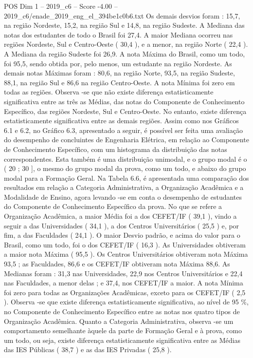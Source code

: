 \begin{textsample}{POS Dim 1 – 2019\_c6 – Score -4.00 – 2019\_c6/enade\_2019\_eng\_el\_394be1c0b6.txt}
Os demais desvios foram : 15,7, na região Nordeste, 15,2, na região Sul e 14,8, na região Sudeste.
A Mediana das notas dos estudantes de todo o Brasil foi 27,4.
A maior Mediana ocorreu nas regiões Nordeste, Sul e Centro-Oeste ( 30,4 ), e a menor, na região Norte ( 22,4 ).
A Mediana da região Sudeste foi 26,9.
A nota Máxima do Brasil, como um todo, foi 95,5, sendo obtida por, pelo menos, um estudante na região Nordeste.
As demais notas Máximas foram : 80,6, na região Norte, 93,5, na região Sudeste, 88,1, na região Sul e 86,6 na região Centro-Oeste.
A nota Mínima foi zero em todas as regiões.
Observa -se que não existe diferença estatisticamente significativa entre as três as Médias, das notas do Componente de Conhecimento Específico, das regiões Nordeste, Sul e Centro-Oeste.
No entanto, existe diferença estatisticamente significativa entre as demais regiões.
Assim como nos Gráficos 6.1 e 6.2, no Gráfico 6.3, apresentado a seguir, é possível ser feita uma avaliação do desempenho de concluintes de Engenharia Elétrica, em relação ao Componente de Conhecimento Específico, com um histograma da distribuição das notas correspondentes.
Esta também é uma distribuição unimodal, e o grupo modal é o ( 20 ; 30 ], o mesmo do grupo modal da prova, como um todo, e abaixo do grupo modal para a Formação Geral.
Na Tabela 6.6, é apresentada uma comparação dos resultados em relação a Categoria Administrativa, a Organização Acadêmica e a Modalidade de Ensino, agora levando -se em conta o desempenho de estudantes do Componente de Conhecimento Específico da prova.
No que se refere a Organização Acadêmica, a maior Média foi a dos CEFET/IF ( 39,1 ), vindo a seguir a das Universidades ( 34,1 ), a dos Centros Universitários ( 25,5 ) e, por fim, a das Faculdades ( 24,1 ).
O maior Desvio padrão, e acima do valor para o Brasil, como um todo, foi o dos CEFET/IF ( 16,3 ).
As Universidades obtiveram a maior nota Máxima ( 95,5 ).
Os Centros Universitários obtiveram nota Máxima 93,5 ; as Faculdades, 86,6 e os CEFET/IF obtiveram nota Máxima 88,6.
As Medianas foram : 31,3 nas Universidades, 22,9 nos Centros Universitários e 22,4 nas Faculdades, a menor delas ; e 37,4, nos CEFET/IF a maior.
A nota Mínima foi zero para todas as Organizações Acadêmicas, exceto para os CEFET/IF ( 2,5 ).
Observa -se que existe diferença estatisticamente significativa, ao nível de 95 \%, no Componente de Conhecimento Específico entre as notas nos quatro tipos de Organização Acadêmica.
Quanto a Categoria Administrativa, observa -se um comportamento semelhante àquele da parte de Formação Geral e à prova, como um todo, ou seja, existe diferença estatisticamente significativa entre as Médias das IES Públicas ( 38,7 ) e as das IES Privadas ( 25,8 ).

\end{textsample}
